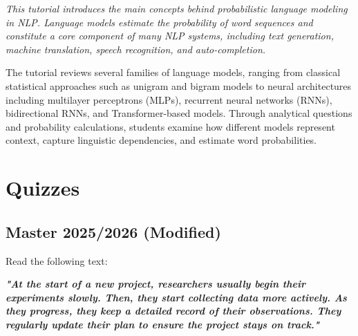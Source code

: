 \documentclass{../extra/aakpract/aakpract}
\begin{document}
	
	\maketitle
	
	\begin{center}
		\begin{minipage}{0.85\textwidth}
			\small\itshape
			This tutorial introduces the main concepts behind probabilistic language modeling in NLP. 
			Language models estimate the probability of word sequences and constitute a core component of many NLP systems, including text generation, machine translation, speech recognition, and auto-completion.
			
			\vspace{6pt}
			The tutorial reviews several families of language models, ranging from classical statistical approaches such as unigram and bigram models to neural architectures including multilayer perceptrons (MLPs), recurrent neural networks (RNNs), bidirectional RNNs, and Transformer-based models. 
			Through analytical questions and probability calculations, students examine how different models represent context, capture linguistic dependencies, and estimate word probabilities.
			
		\end{minipage}
	\end{center}
	
	
	\section{Quizzes}
	
	\subsection{Master 2025/2026 (Modified)}
	
	Read the following text:
	
	\textbf{\small\itshape"At the start of a new project, researchers usually begin their experiments slowly. Then, they start collecting data more actively. As they progress, they keep a detailed record of their observations. They regularly update their plan to ensure the project stays on track."}
	
\end{document}
